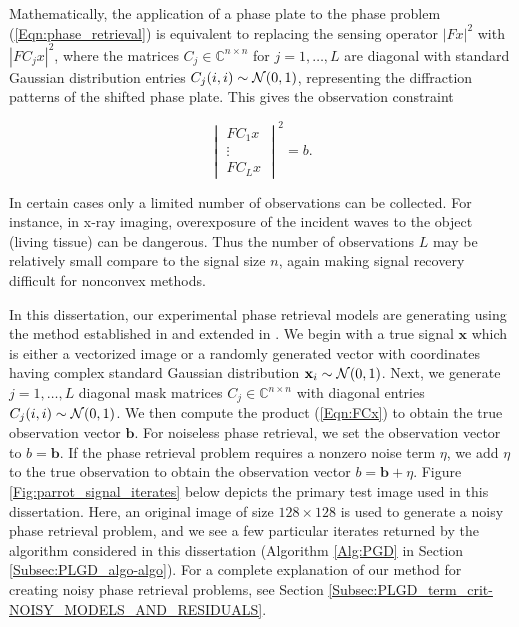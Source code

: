 Mathematically, the application of a phase plate to the phase problem (\ref{Eqn:phase_retrieval}) is equivalent to replacing the sensing operator $|Fx|^2$ with $|FC_jx|^2$, where the matrices $C_j \in \mathbb{C}^{n \times n}$ for $j = 1, \ldots, L$ are diagonal with standard Gaussian distribution entries $C_j(i,i) \sim {\mathcal N}(0, 1)$, representing the diffraction patterns of the shifted phase plate.  This gives the observation constraint

\begin{equation}		\label{Eqn:FCx}
	\begin{vmatrix}
		FC_1x \\ \vdots \\ FC_Lx
	\end{vmatrix}^2
	= b.
\end{equation}

In certain cases only a limited number of observations can be collected.  For instance, in x-ray imaging, overexposure of the incident waves to the object (living tissue) can be dangerous.  Thus the number of observations $L$ may be relatively small compare to the signal size $n$, again making signal recovery difficult for nonconvex methods.





In this dissertation, our experimental phase retrieval models are generating using the method established in \cite{DBLP:journals/tit/CandesLS15} and extended in \cite{DBLP:journals/siamsc/FriedlanderM16}.  
We begin with a true signal $\mathbf{x}$ which is either a vectorized image or a randomly generated vector with coordinates having complex standard Gaussian distribution $\mathbf{x}_i \sim {\mathcal N}(0, 1)$.
Next, we generate $j = 1, \ldots,  L$ diagonal mask matrices $C_j \in \mathbb{C}^{n \times n}$ with diagonal entries $C_j(i,i) \sim {\mathcal N}(0, 1)$.
We then compute the product (\ref{Eqn:FCx}) to obtain the true observation vector $\mathbf{b}$.
For noiseless phase retrieval, we set the observation vector to $b = \mathbf{b}$.
If the phase retrieval problem requires a nonzero noise term $\eta$, we add $\eta$ to the true observation to obtain the observation vector $b = \mathbf{b} + \eta$.
Figure \ref{Fig:parrot_signal_iterates} below depicts the primary test image used in this dissertation.
Here, an original image of size $128 \times 128$ is used to generate a noisy phase retrieval problem, and we see a few particular iterates returned by the algorithm considered in this dissertation (Algorithm \ref{Alg:PGD} in Section \ref{Subsec:PLGD_algo-algo}).  
For a complete explanation of our method for creating noisy phase retrieval problems, see Section \ref{Subsec:PLGD_term_crit-NOISY_MODELS_AND_RESIDUALS}.

